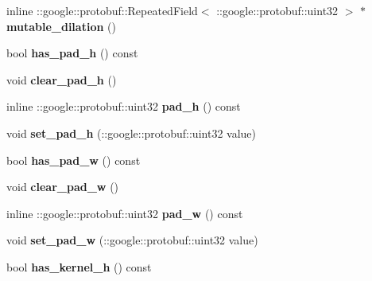 \begin{DoxyCompactItemize}
inline \+::google\+::protobuf\+::\+Repeated\+Field$<$ \+::google\+::protobuf\+::uint32 $>$ $\ast$ {\bfseries mutable\+\_\+dilation} ()
\item 
\mbox{\label{classcaffe_1_1_convolution_parameter_a02b12d3da48a22df8362d1f6c9ff0de9}} 
bool {\bfseries has\+\_\+pad\+\_\+h} () const
\item 
\mbox{\label{classcaffe_1_1_convolution_parameter_ab3d59c37a0e3799a3b07ea22c5f2453b}} 
void {\bfseries clear\+\_\+pad\+\_\+h} ()
\item 
\mbox{\label{classcaffe_1_1_convolution_parameter_afe9a2a4716217fcd821ee798d83f3df1}} 
inline \+::google\+::protobuf\+::uint32 {\bfseries pad\+\_\+h} () const
\item 
\mbox{\label{classcaffe_1_1_convolution_parameter_ab615a4ad7ac7830475fc13d3f9ed4bf5}} 
void {\bfseries set\+\_\+pad\+\_\+h} (\+::google\+::protobuf\+::uint32 value)
\item 
\mbox{\label{classcaffe_1_1_convolution_parameter_a7f112f2ea70f9ebc539a2ae91e87e07e}} 
bool {\bfseries has\+\_\+pad\+\_\+w} () const
\item 
\mbox{\label{classcaffe_1_1_convolution_parameter_ac4e82a36d4adc5824af908a4e9f13bef}} 
void {\bfseries clear\+\_\+pad\+\_\+w} ()
\item 
\mbox{\label{classcaffe_1_1_convolution_parameter_a462af91d015eaf6226a4e64861e458b1}} 
inline \+::google\+::protobuf\+::uint32 {\bfseries pad\+\_\+w} () const
\item 
\mbox{\label{classcaffe_1_1_convolution_parameter_a314eea9a18b80ba7c766e5b0b72372b8}} 
void {\bfseries set\+\_\+pad\+\_\+w} (\+::google\+::protobuf\+::uint32 value)
\item 
\mbox{\label{classcaffe_1_1_convolution_parameter_af756f02efc4e4ffca2a63306a1a28143}} 
bool {\bfseries has\+\_\+kernel\+\_\+h} () const

\end{DoxyCompactItemize}
